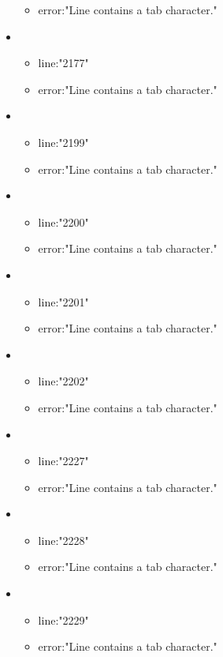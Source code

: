 \begin{itemize}
\begin{itemize}
		\item error:"Line contains a tab character." 
	\end{itemize}
	\item 
	\begin{itemize} 
		\item line:"2177" 
		\item error:"Line contains a tab character." 
	\end{itemize}
	\item 
	\begin{itemize} 
		\item line:"2199" 
		\item error:"Line contains a tab character." 
	\end{itemize}
	\item 
	\begin{itemize} 
		\item line:"2200" 
		\item error:"Line contains a tab character." 
	\end{itemize}
	\item 
	\begin{itemize} 
		\item line:"2201" 
		\item error:"Line contains a tab character." 
	\end{itemize}
	\item 
	\begin{itemize} 
		\item line:"2202" 
		\item error:"Line contains a tab character." 
	\end{itemize}
	\item 
	\begin{itemize} 
		\item line:"2227" 
		\item error:"Line contains a tab character." 
	\end{itemize}
	\item 
	\begin{itemize} 
		\item line:"2228" 
		\item error:"Line contains a tab character." 
	\end{itemize}
	\item 
	\begin{itemize} 
		\item line:"2229" 
		\item error:"Line contains a tab character." 
	\end{itemize}

\end{itemize}
